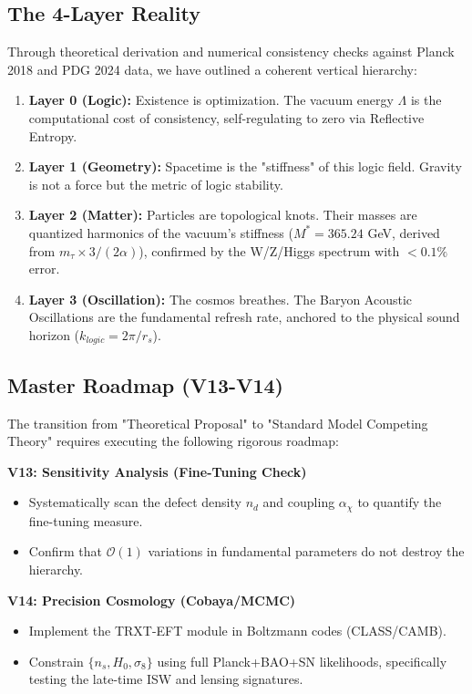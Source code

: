 \documentclass[a4paper,12pt]{article}
\begin{document}
\subsection{The 4-Layer Reality}
Through theoretical derivation and numerical consistency checks against Planck 2018 and PDG 2024 data, we have outlined a coherent vertical hierarchy:
\begin{enumerate}
    \item \textbf{Layer 0 (Logic):} Existence is optimization. The vacuum energy $\Lambda$ is the computational cost of consistency, self-regulating to zero via Reflective Entropy.
    \item \textbf{Layer 1 (Geometry):} Spacetime is the "stiffness" of this logic field. Gravity is not a force but the metric of logic stability.
    \item \textbf{Layer 2 (Matter):} Particles are topological knots. Their masses are quantized harmonics of the vacuum's stiffness ($M^* = 365.24$ GeV, derived from $m_\tau \times 3/(2\alpha)$), confirmed by the W/Z/Higgs spectrum with $<0.1\%$ error.
    \item \textbf{Layer 3 (Oscillation):} The cosmos breathes. The Baryon Acoustic Oscillations are the fundamental refresh rate, anchored to the physical sound horizon ($k_{logic} = 2\pi/r_s$).
\end{enumerate}

\subsection{Master Roadmap (V13-V14)}
The transition from "Theoretical Proposal" to "Standard Model Competing Theory" requires executing the following rigorous roadmap:

\textbf{V13: Sensitivity Analysis (Fine-Tuning Check)}
\begin{itemize}
    \item Systematically scan the defect density $n_d$ and coupling $\alpha_\chi$ to quantify the fine-tuning measure.
    \item Confirm that $\mathcal{O}(1)$ variations in fundamental parameters do not destroy the hierarchy.
\end{itemize}

\textbf{V14: Precision Cosmology (Cobaya/MCMC)}
\begin{itemize}
    \item Implement the TRXT-EFT module in Boltzmann codes (CLASS/CAMB).
    \item Constrain $\{n_s, H_0, \sigma_8\}$ using full Planck+BAO+SN likelihoods, specifically testing the late-time ISW and lensing signatures.
\end{itemize}
\end{document}
